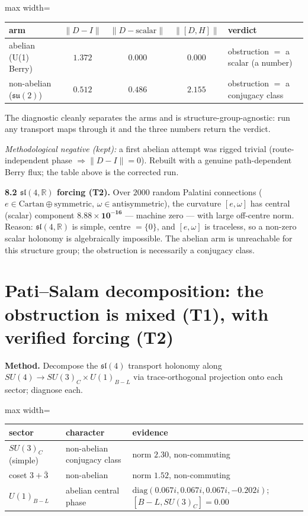 \documentclass[11pt]{article}
\newcommand{\sltwo}{\mathfrak{sl}(4,\mathbb{R})}
\begin{document}
\begin{center}
\begin{adjustbox}{max width=\linewidth}\begin{tabular}{lcccl}
\toprule
arm & $\|D-I\|$ & $\|D-\text{scalar}\|$ & $\|[D,H]\|$ & verdict \\
\midrule
abelian (U(1) Berry) & $1.372$ & $\mathbf{0.000}$ & $\mathbf{0.000}$ & obstruction $=$ a scalar (a number) \\
non-abelian ($\mathfrak{su}(2)$) & $0.512$ & $0.486$ & $\mathbf{2.155}$ & obstruction $=$ a conjugacy class \\
\bottomrule
\end{tabular}\end{adjustbox}
\end{center}

\noindent The diagnostic cleanly separates the arms and is structure-group-agnostic: run any transport maps through it and the three numbers return the verdict.

\emph{Methodological negative (kept):} a first abelian attempt was rigged trivial (route-independent phase $\Rightarrow\|D-I\|=0$). Rebuilt with a genuine path-dependent Berry flux; the table above is the corrected run.

\textbf{8.2 $\sltwo$ forcing (T2).} Over $2000$ random Palatini connections ($e\in\text{Cartan}\oplus\text{symmetric}$, $\omega\in\text{antisymmetric}$), the curvature $[e,\omega]$ has central (scalar) component $\mathbf{8.88\times10^{-16}}$ --- machine zero --- with large off-centre norm. Reason: $\sltwo$ is simple, centre $=\{0\}$, and $[e,\omega]$ is traceless, so a non-zero scalar holonomy is algebraically impossible. The abelian arm is unreachable for this structure group; the obstruction is necessarily a conjugacy class.

\section{Pati--Salam decomposition: the obstruction is mixed (T1), with verified forcing (T2)}

\textbf{Method.} Decompose the $\mathfrak{sl}(4)$ transport holonomy along $SU(4)\to SU(3)_C\times U(1)_{B-L}$ via trace-orthogonal projection onto each sector; diagnose each.

\begin{center}
\begin{adjustbox}{max width=\linewidth}\begin{tabular}{lll}
\toprule
sector & character & evidence \\
\midrule
$SU(3)_C$ (simple) & non-abelian conjugacy class & norm $2.30$, non-commuting \\
coset $3+\bar3$ & non-abelian & norm $1.52$, non-commuting \\
$U(1)_{B-L}$ & abelian central phase & $\mathrm{diag}(0.067i,0.067i,0.067i,-0.202i)$; $[B{-}L,SU(3)_C]=0.00$ \\
\bottomrule
\end{tabular}\end{adjustbox}
\end{center}
\end{document}
